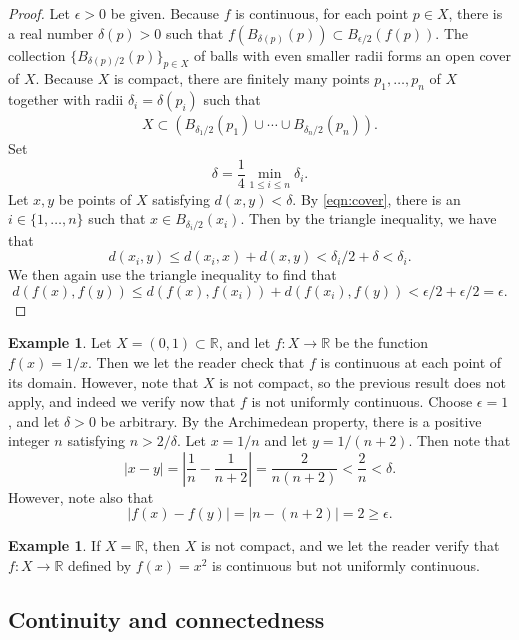 \documentclass[12pt]{article}
\theoremstyle{definition}
\newtheorem{example}[definition]{Example}
\theoremstyle{theorem}
\begin{document}
\begin{proof}
Let $\epsilon > 0$ be given. Because $f$ is continuous, for each point $p \in X$, there is a real number $\delta(p) > 0$ such that $f(B_{\delta(p)}(p)) \subset B_{\epsilon/2}(f(p))$. The collection $\{B_{\delta(p)/2}(p)\}_{p \in X}$ of balls with even smaller radii forms an open cover of $X$. Because $X$ is compact, there are finitely many points $p_1, \ldots, p_n$ of $X$ together with radii $\delta_i = \delta(p_i)$ such that 
\begin{align}\label{eqn:cover}
X \subset (B_{\delta_1/2}(p_1) \cup \cdots \cup B_{\delta_n/2}(p_n)).
\end{align}
Set 
\[
\delta = \frac{1}{4} \min_{1 \leqslant i \leqslant n} \delta_i.
\]
Let $x,y$ be points of $X$ satisfying $d(x,y) < \delta$. By \eqref{eqn:cover}, there is an $i \in \{1, \ldots, n\}$ such that $x \in B_{\delta_i/2}(x_i)$. Then by the triangle inequality, we have that 
\[
d(x_i, y) \leqslant d(x_i, x) + d(x,y) < \delta_i/2 + \delta < \delta_i.
\]
We then again use the triangle inequality to find that 
\[
d(f(x), f(y)) \leqslant d(f(x), f(x_i)) + d(f(x_i), f(y)) < \epsilon/2 + \epsilon/2 = \epsilon.
\]
\end{proof}


\begin{example}
Let $X = (0,1) \subset \mathbb{R}$, and let $f : X \to \mathbb{R}$ be the function $f(x) = 1/x$. Then we let the reader check that $f$ is continuous at each point of its domain. However, note that $X$ is not compact, so the previous result does not apply, and indeed we verify now that $f$ is not uniformly continuous.  Choose $\epsilon = 1$, and let $\delta > 0$ be arbitrary. By the Archimedean property, there is a positive integer $n$ satisfying $n > 2/\delta$. Let $x = 1/n$ and let $y = 1/(n+2)$. Then note that 
\[
|x - y| = \left|\frac{1}{n} - \frac{1}{n+2}\right| = \frac{2}{n(n+2)} < \frac{2}{n} < \delta.
\] 
However, note also that 
\[
|f(x) - f(y)| = |n - (n+2)| = 2 \geqslant \epsilon.
\]
\end{example}

\begin{example}
If $X = \mathbb{R}$, then $X$ is not compact, and we let the reader verify that $f : X \to \mathbb{R}$ defined by $f(x) = x^2$ is continuous but not uniformly continuous. 
\end{example}

\subsection{Continuity and connectedness}
\end{document}

